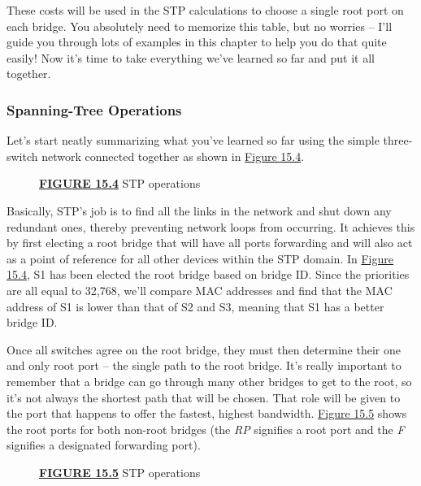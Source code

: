 These costs will be used in the STP calculations to choose a single root
port on each bridge. You absolutely need to memorize this table, but no
worries -- I'll guide you through lots of examples in this chapter to
help you do that quite easily! Now it's time to take everything we've
learned so far and put it all together.

\subsubsection[Spanning-Tree
Operations]{\texorpdfstring{\protect\hypertarget{c15.xhtmlux5cux23c15-sec-11}{}{}Spanning-Tree
Operations}{Spanning-Tree Operations}}

Let's start neatly summarizing what you've learned so far using the
simple three-switch network connected together as shown in
\protect\hyperlink{c15.xhtmlux5cux23figure15-4}{Figure 15.4}.

\begin{figure}
\centering
\caption{{\protect\hyperlink{c15.xhtmlux5cux23figureanchor15-4}{\textbf{FIGURE
15.4}} STP operations}}
\end{figure}

Basically, STP's job is to find all the links in the network and shut
down any redundant ones, thereby preventing network loops from
occurring. It achieves this by first electing a root bridge that will
have all ports forwarding and will also act as a point of reference for
all other devices within the STP domain. In
\protect\hyperlink{c15.xhtmlux5cux23figure15-4}{Figure 15.4}, S1 has
been elected the root
bridge based on
bridge ID. Since the priorities are all equal to 32,768, we'll compare
MAC addresses and find that the MAC address of S1 is lower than that of
S2 and S3, meaning that S1 has a better bridge ID.

Once all switches agree on the root bridge, they must then determine
their one and only root port -- the single path to the root bridge. It's
really important to remember that a bridge can go through many other
bridges to get to the root, so it's not always the shortest path that
will be chosen. That role will be given to the port that happens to
offer the fastest, highest bandwidth.
\protect\hyperlink{c15.xhtmlux5cux23figure15-5}{Figure 15.5} shows the
root ports for both non-root bridges (the \emph{RP} signifies a root
port and the \emph{F} signifies a designated forwarding port).



\begin{figure}
\centering
\caption{{\protect\hyperlink{c15.xhtmlux5cux23figureanchor15-5}{\textbf{FIGURE
15.5}} STP operations}}
\end{figure}

